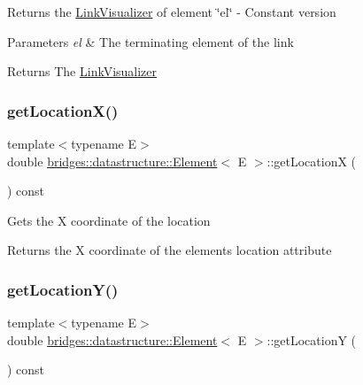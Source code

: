Returns the \hyperlink{classbridges_1_1datastructure_1_1_link_visualizer}{Link\+Visualizer} of element \char`\"{}el\char`\"{} -\/ Constant version


\begin{DoxyParams}{Parameters}
{\em el} & The terminating element of the link \\
\hline
\end{DoxyParams}
\begin{DoxyReturn}{Returns}
The \hyperlink{classbridges_1_1datastructure_1_1_link_visualizer}{Link\+Visualizer} 
\end{DoxyReturn}
\mbox{\label{classbridges_1_1datastructure_1_1_element_a471f2f69147deb0f514bb9720e0e18ea}} 
\subsubsection{\texorpdfstring{get\+Location\+X()}{getLocationX()}}
{\footnotesize\ttfamily template$<$typename E$>$ \\
double \hyperlink{classbridges_1_1datastructure_1_1_element}{bridges\+::datastructure\+::\+Element}$<$ E $>$\+::get\+LocationX (\begin{DoxyParamCaption}{ }\end{DoxyParamCaption}) const\hspace{0.3cm}{\ttfamily [inline]}}

Gets the X coordinate of the location \begin{DoxyReturn}{Returns}
the X coordinate of the element\textquotesingle{}s location attribute 
\end{DoxyReturn}
\mbox{\label{classbridges_1_1datastructure_1_1_element_a6394039086bc1f27f2e6adf73294a74b}} 
\subsubsection{\texorpdfstring{get\+Location\+Y()}{getLocationY()}}
{\footnotesize\ttfamily template$<$typename E$>$ \\
double \hyperlink{classbridges_1_1datastructure_1_1_element}{bridges\+::datastructure\+::\+Element}$<$ E $>$\+::get\+LocationY (\begin{DoxyParamCaption}{ }\end{DoxyParamCaption}) const\hspace{0.3cm}{\ttfamily [inline]}}

